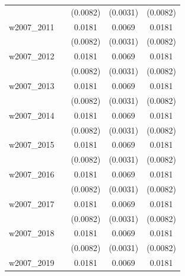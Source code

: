 \begin{table}[htbp]
\begin{tabular}{l*{4}{c}}
            &                     &    (0.0082)         &    (0.0031)         &    (0.0082)         \\
[1em]
w2007\_2011  &                     &      0.0181\sym{**} &      0.0069\sym{**} &      0.0181\sym{**} \\
            &                     &    (0.0082)         &    (0.0031)         &    (0.0082)         \\
[1em]
w2007\_2012  &                     &      0.0181\sym{**} &      0.0069\sym{**} &      0.0181\sym{**} \\
            &                     &    (0.0082)         &    (0.0031)         &    (0.0082)         \\
[1em]
w2007\_2013  &                     &      0.0181\sym{**} &      0.0069\sym{**} &      0.0181\sym{**} \\
            &                     &    (0.0082)         &    (0.0031)         &    (0.0082)         \\
[1em]
w2007\_2014  &                     &      0.0181\sym{**} &      0.0069\sym{**} &      0.0181\sym{**} \\
            &                     &    (0.0082)         &    (0.0031)         &    (0.0082)         \\
[1em]
w2007\_2015  &                     &      0.0181\sym{**} &      0.0069\sym{**} &      0.0181\sym{**} \\
            &                     &    (0.0082)         &    (0.0031)         &    (0.0082)         \\
[1em]
w2007\_2016  &                     &      0.0181\sym{**} &      0.0069\sym{**} &      0.0181\sym{**} \\
            &                     &    (0.0082)         &    (0.0031)         &    (0.0082)         \\
[1em]
w2007\_2017  &                     &      0.0181\sym{**} &      0.0069\sym{**} &      0.0181\sym{**} \\
            &                     &    (0.0082)         &    (0.0031)         &    (0.0082)         \\
[1em]
w2007\_2018  &                     &      0.0181\sym{**} &      0.0069\sym{**} &      0.0181\sym{**} \\
            &                     &    (0.0082)         &    (0.0031)         &    (0.0082)         \\
[1em]
w2007\_2019  &                     &      0.0181\sym{**} &      0.0069\sym{**} &      0.0181\sym{**} \\

\end{tabular}
\end{table}
